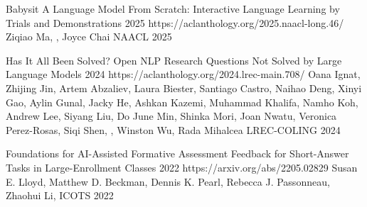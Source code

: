 \CVPublication
  {Babysit A Language Model From Scratch: Interactive Language Learning by Trials and Demonstrations}
  {2025}
  {https://aclanthology.org/2025.naacl-long.46/}
  {Ziqiao Ma\CVEqual, \CVNameInAuthors\CVEqual, Joyce Chai}
  {NAACL 2025}

\CVPublication
  {Has It All Been Solved? Open NLP Research Questions Not Solved by Large Language Models}
  {2024}
  {https://aclanthology.org/2024.lrec-main.708/}
  {Oana Ignat\CVEqual, Zhijing Jin\CVEqual, Artem Abzaliev, Laura Biester, Santiago Castro,
   Naihao Deng, Xinyi Gao, Aylin Gunal, Jacky He, Ashkan Kazemi, Muhammad Khalifa,
   Namho Koh, Andrew Lee, Siyang Liu, Do June Min, Shinka Mori, Joan Nwatu,
   Veronica Perez-Rosas, Siqi Shen, \CVNameInAuthors, Winston Wu, Rada Mihalcea}
  {LREC-COLING 2024}

\CVPublication
  {Foundations for AI-Assisted Formative Assessment Feedback for Short-Answer Tasks in Large-Enrollment Classes}
  {2022}
  {https://arxiv.org/abs/2205.02829}
  {Susan E. Lloyd, Matthew D. Beckman, Dennis K. Pearl, Rebecca J. Passonneau,
   Zhaohui Li, \CVNameInAuthors}
  {ICOTS 2022}
